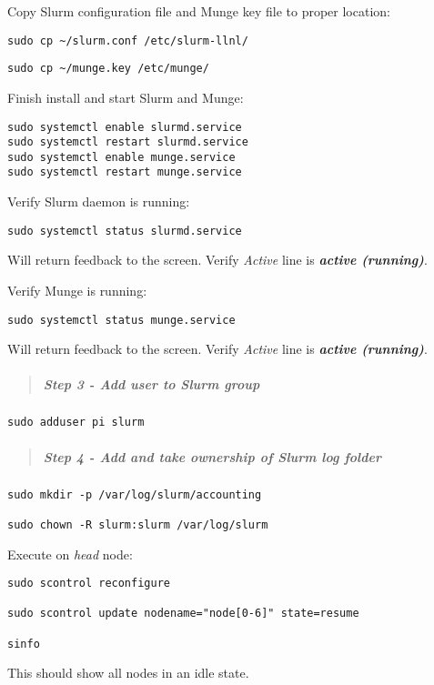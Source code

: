 \documentclass[]{article}
\let\oldsubparagraph\subparagraph
\renewcommand{\subparagraph}[1]{\oldsubparagraph{#1}\mbox{}}
\begin{document}
Copy Slurm configuration file and Munge key file to proper location:

\texttt{sudo\ cp\ \textasciitilde{}/slurm.conf\ /etc/slurm-llnl/}

\texttt{sudo\ cp\ \textasciitilde{}/munge.key\ /etc/munge/}

Finish install and start Slurm and Munge:

\begin{verbatim}
sudo systemctl enable slurmd.service
sudo systemctl restart slurmd.service
sudo systemctl enable munge.service
sudo systemctl restart munge.service
\end{verbatim}

Verify Slurm daemon is running:

\texttt{sudo\ systemctl\ status\ slurmd.service}

Will return feedback to the screen. Verify \emph{Active} line is
\emph{\textbf{active (running)}}.

Verify Munge is running:

\texttt{sudo\ systemctl\ status\ munge.service}

Will return feedback to the screen. Verify \emph{Active} line is
\emph{\textbf{active (running)}}.

\begin{quote}
\mbox{}%
\subparagraph{Step 3 - Add user to Slurm
group}\label{step-3---add-user-to-slurm-group}
\end{quote}

\texttt{sudo\ adduser\ pi\ slurm}

\begin{quote}
\mbox{}%
\subparagraph{Step 4 - Add and take ownership of Slurm log
folder}\label{step-4---add-and-take-ownership-of-slurm-log-folder}
\end{quote}

\begin{verbatim}
sudo mkdir -p /var/log/slurm/accounting

sudo chown -R slurm:slurm /var/log/slurm
\end{verbatim}

Execute on \emph{head} node:

\begin{verbatim}
sudo scontrol reconfigure

sudo scontrol update nodename="node[0-6]" state=resume

sinfo
\end{verbatim}

This should show all nodes in an idle state.
\end{document}
